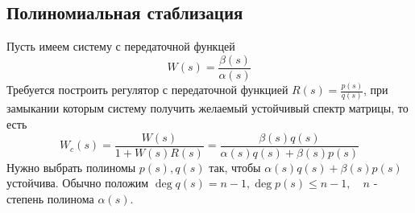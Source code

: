 \documentclass[A4]{article}
\begin{document}
\subsection{Полиномиальная стаблизация}
Пусть имеем систему с передаточной функцей 
\begin{equation*}
W(s)=\frac{\beta(s)}{\alpha(s)}
\end{equation*}
Требуется построить регулятор с передаточной функцией $R(s)=\frac{p(s)}{q(s)}$, при замыкании которым систему получить желаемый устойчивый спектр матрицы, то есть
\begin{equation*}
W_c(s)=\frac{W(s)}{1+W(s)R(s)}=\frac{\beta(s)q(s)}{\alpha(s)q(s)+\beta(s)p(s)}
\end{equation*}
Нужно выбрать полиномы $p(s),q(s)$ так, чтобы $\alpha(s)q(s)+\beta(s)p(s)$ устойчива. Обычно положим $\deg q(s)=n-1,\deg p(s)\leqslant n-1,\quad n$ - степень полинома $\alpha(s)$.\\
\end{document}
